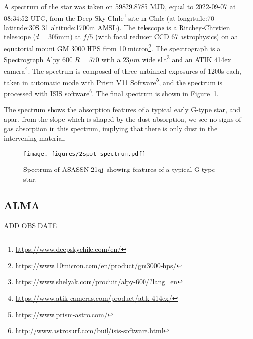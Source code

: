 \documentclass{aa}
\newcommand{\asas}{ASASSN-21qj}
\begin{document}
A spectrum of the star was taken on 59829.8785 MJD, equal to 2022-09-07 at 08:34:52 UTC, from the Deep Sky Chile\footnote{\url{https://www.deepskychile.com/en/}} site in Chile (at longitude:70
latitude:30\degr S 31 altitude:1700m AMSL).
%
The telescope is a Ritchey-Chretien telescope ($d=305$mm) at $f/5$ (with focal reducer CCD 67 astrophysics) on an equatorial mount GM 3000 HPS from 10 micron\footnote{\url{https://www.10micron.com/en/product/gm3000-hps/}}.
%
The spectrograph is a Spectrograph Alpy 600 $R=570$ with a $23\mu m$ wide slit\footnote{\url{https://www.shelyak.com/produit/alpy-600/?lang=en}} and an ATIK 414ex camera\footnote{\url{https://www.atik-cameras.com/product/atik-414ex/}}.
%
The spectrum is composed of three unbinned exposures of 1200s each, taken in automatic mode with Prism V11 Software\footnote{\url{https://www.prism-astro.com/}}, and the spectrum is processed with ISIS software\footnote{\url{http://www.astrosurf.com/buil/isis-software.html}}.
%
The final spectrum is shown in Figure~\ref{fig:2spotspectrum}.

The spectrum shows the absorption features of a typical early G-type star, and apart from the slope which is shaped by the dust absorption, we see no signs of gas absorption in this spectrum, implying that there is only dust in the intervening material.



\begin{figure}
    \begin{centering}
        \texttt{[image: figures/2spot\_spectrum.pdf]}
\caption{Spectrum of \asas\ showing features of a typical G type star.}
        \label{fig:2spotspectrum}
    \end{centering}
\end{figure}

\subsection{ALMA}

ADD OBS DATE
\end{document}
